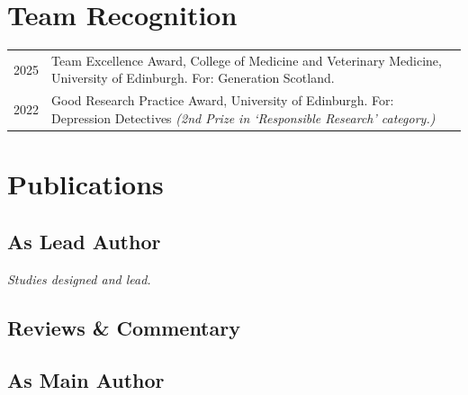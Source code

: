 \documentclass[11pt]{article}
\begin{document}
\section*{Team Recognition}

\begin{tabular}{p{3cm}p{12cm}}

2025 & Team Excellence Award, College of Medicine and Veterinary Medicine, University of Edinburgh. For: Generation Scotland.\\
2022 & Good Research Practice Award, University of Edinburgh. For: Depression Detectives \emph{(2nd Prize in `Responsible Research' category.)}

\end{tabular}

\section*{Publications}

\nocite{*}

\setlength\bibhang{0pt}

% 

% 

\subsection*{As Lead Author}

\textit{Studies designed and lead.}

\printbibliography[type=article,keyword=lead,heading=none]

\subsection*{Reviews \& Commentary}

\printbibliography[type=article,keyword=review,heading=none]

\subsection*{As Main Author}
\end{document}
